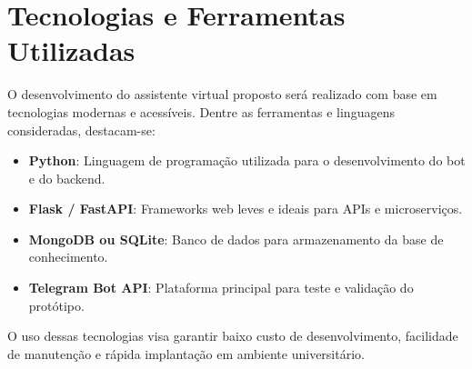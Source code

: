 \section{Tecnologias e Ferramentas Utilizadas}

O desenvolvimento do assistente virtual proposto será realizado com base em tecnologias modernas e acessíveis. Dentre as ferramentas e linguagens consideradas, destacam-se:

\begin{itemize}
    \item \textbf{Python}: Linguagem de programação utilizada para o desenvolvimento do bot e do backend.
    \item \textbf{Flask / FastAPI}: Frameworks web leves e ideais para APIs e microserviços.
    \item \textbf{MongoDB ou SQLite}: Banco de dados para armazenamento da base de conhecimento.
    \item \textbf{Telegram Bot API}: Plataforma principal para teste e validação do protótipo.
\end{itemize}

O uso dessas tecnologias visa garantir baixo custo de desenvolvimento, facilidade de manutenção e rápida implantação em ambiente universitário.
